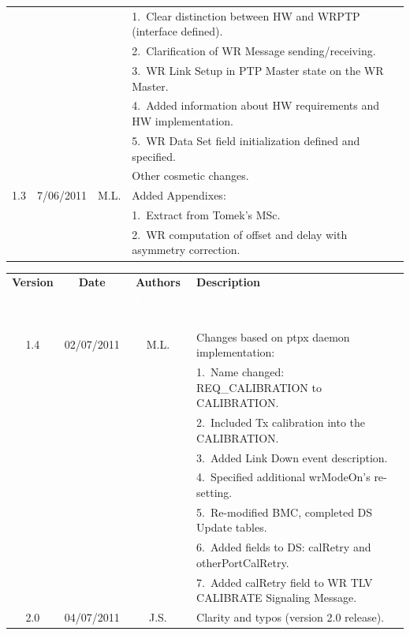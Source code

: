 \documentclass[a4paper, 12pt]{article}
\begin{document}
\begin{table}[ht!]
\begin{tabular}{| c |  c | c | p{8cm}    |}
    &            &               & 1.~Clear distinction between HW and WRPTP (interface defined). \\
    &            &               & 2.~Clarification of WR Message sending/receiving. \\
    &            &               & 3.~WR Link Setup in PTP Master state on the WR Master. \\
    &            &               & 4.~Added information about HW requirements and HW 
				      implementation. \\
    &            &               & 5.~WR Data Set field initialization defined and specified. \\
    &            &               & Other cosmetic changes. \\
\hline
1.3 & 7/06/2011  & M.L.          & Added Appendixes: \\
    &            &               & 1.~Extract from Tomek's MSc. \\
    &            &               & 2.~WR computation of offset and delay with asymmetry correction.\\
\hline
\end{tabular}
\label{tab:revHist}
\end{table}

\newpage

\begin{table}[ht!]
\centering
\begin{tabular}{| c |  c | c | p{8cm}    |}          \hline
\textbf{Version} & \textbf{Date} & \textbf{Authors} & \textbf{Description}  \\ 
 & & \textcolor{white}{E.V.D.B., J.S} &\\ \hline
1.4 & 02/07/2011 & M.L.          & Changes based on ptpx daemon implementation: \\
    &            &               & 1.~Name changed: REQ\_CALIBRATION to CALIBRATION.\\
    &            &               & 2.~Included Tx calibration into the CALIBRATION.\\
    &            &               & 3.~Added Link Down event description.\\
    &            &               & 4.~Specified additional wrModeOn's re-setting.\\
    &            &               & 5.~Re-modified BMC, completed DS Update tables.\\
    &            &               & 6.~Added fields to DS: calRetry and otherPortCalRetry.\\
    &            &               & 7.~Added calRetry field to WR TLV CALIBRATE Signaling Message.\\
\hline
2.0 & 04/07/2011 & J.S.          & Clarity and typos (version 2.0 release). \\
\hline
\end{tabular}
\label{tab:revHist}
\end{table}
\end{document}
